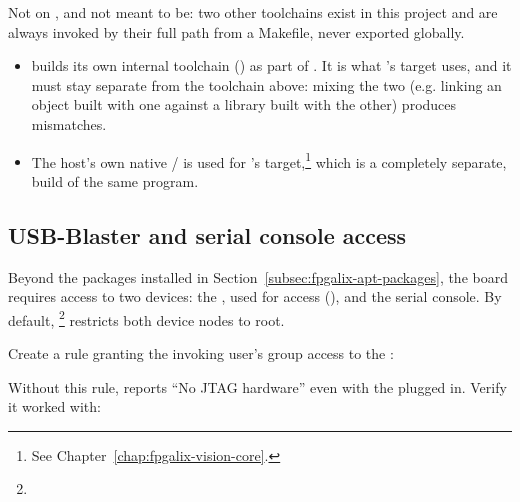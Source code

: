Not on , and not meant to be: two other  toolchains exist in this project and are always invoked by their full path from a Makefile, never exported globally.

\begin{itemize}
    \item {} builds its own internal toolchain () as part of . It is what 's  target uses, and it must stay separate from the toolchain above: mixing the two (e.g. linking an object built with one against a library built with the other) produces   mismatches.
    \item The host's own native / is used for 's  target,\footnote{See Chapter~\ref{chap:fpgalix-vision-core}.} which is a completely separate,  build of the same program.
\end{itemize}

\subsection{USB-Blaster and serial console access}

Beyond the packages installed in Section~\ref{subsec:fpgalix-apt-packages}, the board requires access to two  devices: the , used for  access (), and the  serial console. By default, \footnote{} restricts both device nodes to root.

Create a  rule granting the invoking user's group access to the :


Without this rule,  reports ``No JTAG hardware'' even with the  plugged in. Verify it worked with:

